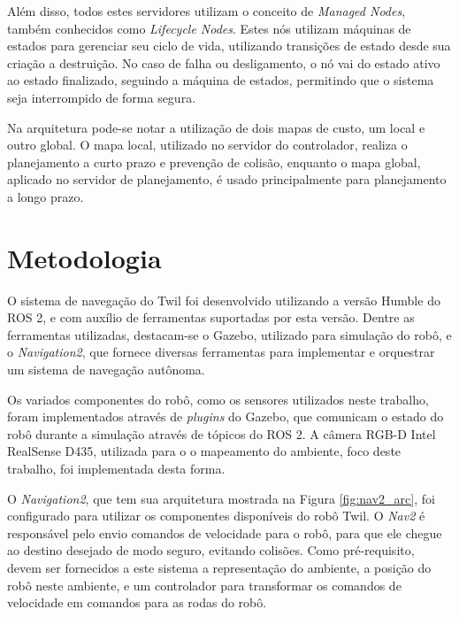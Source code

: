 \documentclass[repeatfields,xlists,xpacks,oneside,yearsonly]{ufrgscca}
\begin{document}
Além disso, todos estes servidores utilizam o conceito de
\textit{Managed Nodes}, também conhecidos como \textit{Lifecycle
    Nodes}. Estes nós utilizam máquinas de estados para gerenciar seu
ciclo de vida, utilizando transições de estado desde sua criação a
destruição. No caso de falha ou desligamento, o nó vai do estado
ativo ao estado finalizado, seguindo a máquina de estados, permitindo
que o sistema seja interrompido de forma segura.

Na arquitetura pode-se notar a utilização de dois mapas de custo, um
local e outro global. O mapa local, utilizado no servidor do
controlador, realiza o planejamento a curto prazo e prevenção de
colisão, enquanto o mapa global, aplicado no servidor de
planejamento, é usado principalmente para planejamento a longo prazo.

\chapter{Metodologia}
\label{desenvolvimento}

O sistema de navegação do Twil foi desenvolvido utilizando a versão
Humble do ROS 2, e com auxílio de ferramentas suportadas por esta
versão. Dentre as ferramentas utilizadas, destacam-se o Gazebo,
utilizado para simulação do robô, e o \textit{Navigation2}, que
fornece diversas ferramentas para implementar e orquestrar um sistema
de navegação autônoma.

Os variados componentes do robô, como os sensores utilizados neste
trabalho, foram implementados através de \textit{plugins} do Gazebo,
que comunicam o estado do robô durante a simulação através de tópicos
do ROS 2. A câmera RGB-D Intel RealSense D435, utilizada para o o
mapeamento do ambiente, foco deste trabalho, foi implementada desta
forma.

O \textit{Navigation2}, que tem sua arquitetura mostrada na Figura
\ref{fig:nav2_arc}, foi configurado para utilizar os componentes
disponíveis do robô Twil. O \textit{Nav2} é responsável pelo envio
comandos de velocidade para o robô, para que ele chegue ao destino
desejado de modo seguro, evitando colisões. Como pré-requisito, devem
ser fornecidos a este sistema a representação do ambiente, a posição
do robô neste ambiente, e um controlador para transformar os comandos
de velocidade em comandos para as rodas do robô.
\end{document}
